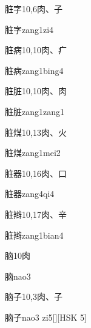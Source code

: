 \begin{Entry}{脏字}{10,6}{⾁、⼦}
  \begin{Phonetics}{脏字}{zang1zi4}
  \end{Phonetics}
\end{Entry}

\begin{Entry}{脏病}{10,10}{⾁、⽧}
  \begin{Phonetics}{脏病}{zang1bing4}
  \end{Phonetics}
\end{Entry}

\begin{Entry}{脏脏}{10,10}{⾁、⾁}
  \begin{Phonetics}{脏脏}{zang1zang1}
  \end{Phonetics}
\end{Entry}

\begin{Entry}{脏煤}{10,13}{⾁、⽕}
  \begin{Phonetics}{脏煤}{zang1mei2}
  \end{Phonetics}
\end{Entry}

\begin{Entry}{脏器}{10,16}{⾁、⼝}
  \begin{Phonetics}{脏器}{zang4qi4}
  \end{Phonetics}
\end{Entry}

\begin{Entry}{脏辫}{10,17}{⾁、⾟}
  \begin{Phonetics}{脏辫}{zang1bian4}
  \end{Phonetics}
\end{Entry}

\begin{Entry}{脑}{10}{⾁}
  \begin{Phonetics}{脑}{nao3}
  \end{Phonetics}
\end{Entry}

\begin{Entry}{脑子}{10,3}{⾁、⼦}
  \begin{Phonetics}{脑子}{nao3 zi5}[][HSK 5]
  \end{Phonetics}
\end{Entry}

